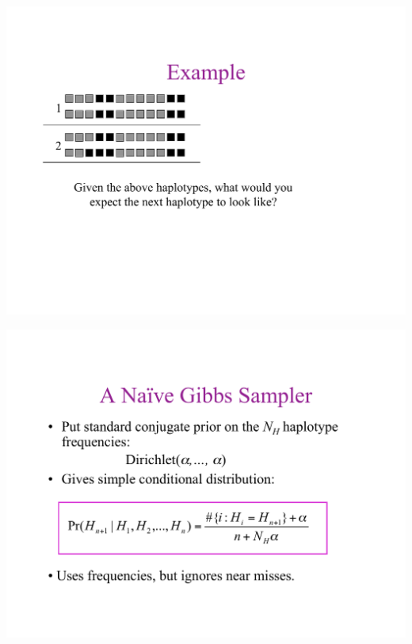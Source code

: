 \newslide{}
\mbox{}
\vspace*{\VertUp}
\enlargethispage*{1000pt}
\begin{center}
\includegraphics*[width=\textwidth]{PPT_pages/pg_0037.pdf}
\end{center}


\newslide{}
\mbox{}
\vspace*{\VertUp}
\enlargethispage*{1000pt}
\begin{center}
\includegraphics*[width=\textwidth]{PPT_pages/pg_0038.pdf}
\end{center}


